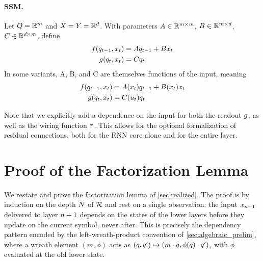 \documentclass{article}
\begin{document}
\paragraph{SSM.}
Let $Q=\mathbb{R}^m$ and $X=Y=\mathbb{R}^d$. With parameters
$A\in\mathbb{R}^{m\times m}$, $B\in\mathbb{R}^{m\times d}$, $C\in\mathbb{R}^{d\times m}$, define
\begin{align}
f(q_{t-1},x_t) &= Aq_{t-1}+Bx_{t}\\
g(q_t,x_t) &= Cq_t
\end{align}
In some variants, A, B, and C are themselves functions of the input, meaning
\begin{align}
f(q_{t-1},x_t) &= A(x_t)q_{t-1}+B(x_t)x_{t}\\
g(q_t,x_t) &= C(u_t)q_t
\end{align}

\begin{remark}
    Note that we explicitly add a dependence on the input for both the readout $g$, as well as the wiring function $\tau$.
    This allows for the optional formalization of residual connections, both for the RNN core alone and for the entire layer.
\end{remark}

\section{Proof of the Factorization Lemma}\label{app:lemma}

We restate and prove the factorization lemma of \cref{sec:realized}. The proof is by induction on the depth $N$ of $\mathcal{R}$ and rest on a single observation: the input $x_{n+1}$ delivered to layer $n+1$ depends on the states of the lower layers before they update on the current symbol, never after. This is precisely the dependency pattern encoded by the left-wreath-product convention of \cref{sec:algebraic_prelim}, where a wreath element $(m, \phi)$ acts as
$(q, q') \mapsto (m \cdot q, \phi(q) \cdot q')$, with $\phi$ evaluated at the old lower state.

\factorization*
\end{document}
